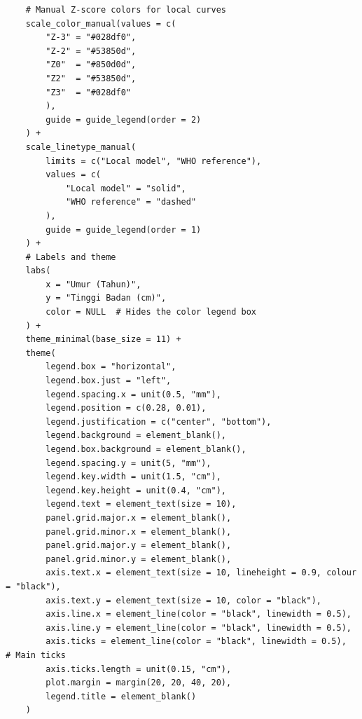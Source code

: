\documentclass[11pt, a4paper]{article}
\begin{document}
\begin{lstlisting}
    # Manual Z-score colors for local curves
    scale_color_manual(values = c(
        "Z-3" = "#028df0",
        "Z-2" = "#53850d",
        "Z0"  = "#850d0d",
        "Z2"  = "#53850d",
        "Z3"  = "#028df0"
        ),
        guide = guide_legend(order = 2)
    ) +
    scale_linetype_manual(
        limits = c("Local model", "WHO reference"),
        values = c(
            "Local model" = "solid",
            "WHO reference" = "dashed"
        ),
        guide = guide_legend(order = 1)
    ) +
    # Labels and theme
    labs(
        x = "Umur (Tahun)",
        y = "Tinggi Badan (cm)",
        color = NULL  # Hides the color legend box
    ) +
    theme_minimal(base_size = 11) +
    theme(
        legend.box = "horizontal",
        legend.box.just = "left",
        legend.spacing.x = unit(0.5, "mm"),
        legend.position = c(0.28, 0.01),
        legend.justification = c("center", "bottom"),
        legend.background = element_blank(),
        legend.box.background = element_blank(),
        legend.spacing.y = unit(5, "mm"),
        legend.key.width = unit(1.5, "cm"),
        legend.key.height = unit(0.4, "cm"),
        legend.text = element_text(size = 10),
        panel.grid.major.x = element_blank(),
        panel.grid.minor.x = element_blank(),
        panel.grid.major.y = element_blank(),
        panel.grid.minor.y = element_blank(),
        axis.text.x = element_text(size = 10, lineheight = 0.9, colour = "black"),
        axis.text.y = element_text(size = 10, color = "black"),
        axis.line.x = element_line(color = "black", linewidth = 0.5),
        axis.line.y = element_line(color = "black", linewidth = 0.5),
        axis.ticks = element_line(color = "black", linewidth = 0.5),  # Main ticks
        axis.ticks.length = unit(0.15, "cm"), 
        plot.margin = margin(20, 20, 40, 20),
        legend.title = element_blank()
    )
\end{lstlisting}
\end{document}

